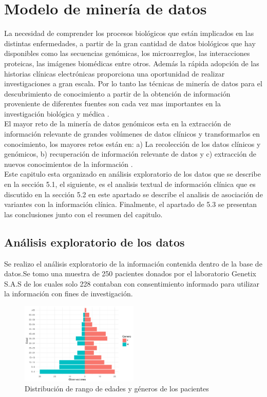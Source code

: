 \chapter{Modelo de minería de datos}

La necesidad de comprender los procesos biológicos que están implicados en las distintas enfermedades, a partir de la gran cantidad de datos biológicos que hay disponibles como las secuencias genómicas, los microarreglos, las interacciones proteicas, las imágenes biomédicas entre otros. Además la rápida adopción de las historias clínicas electrónicas proporciona una oportunidad de realizar investigaciones a gran escala. Por lo tanto las técnicas de minería de datos para el descubrimiento de conocimiento a partir de la obtención de información proveniente de diferentes fuentes son cada vez mas importantes en la investigación biológica y médica \cite{Wang2017}.\\

El mayor reto de la minería de datos genómicos esta en la extracción de información relevante de grandes volúmenes de datos clínicos y transformarlos en conocimiento, los mayores retos están en: a) La recolección de los datos clínicos y genómicos, b) recuperación de información relevante de datos y c) extracción de nuevos conocimientos de la información \cite{Farid2016}. \\  

Este capitulo esta organizado en análisis exploratorio de los datos que se describe en la sección 5.1, el siguiente, es el analisis textual de información clínica que es discutido en la sección 5.2 en este apartado se describe el analisis de asociación de variantes con la información clínica. Finalmente, el apartado de 5.3 se presentan las conclusiones junto con el resumen del capitulo. 

\section{Análisis exploratorio de los datos}

Se realizo el análisis exploratorio de la información contenida dentro de la base de datos.Se tomo una muestra de 250 pacientes donados por el laboratorio Genetix S.A.S de los cuales solo 228 contaban con consentimiento informado para utilizar la información con fines de investigación.\\

\begin{figure}[h!]
	\centering
	\includegraphics[width=0.5\textwidth]{Kap4/general}
	\caption{Distribución de rango de edades y géneros de los pacientes}
	\label{fig:general}
\end{figure}

